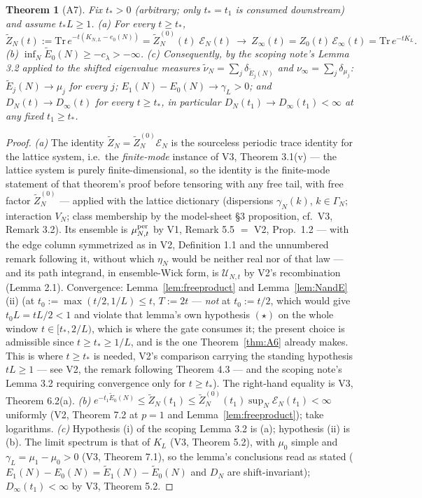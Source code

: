 \documentclass[11pt,a4paper]{article}
\theoremstyle{plain}
\newtheorem{theorem}{Theorem}[section]
\theoremstyle{definition}
\newcommand{\U}{\mathcal U}
\newcommand{\Trace}{\mathrm{Tr}}
\begin{document}
\begin{theorem}[A7]\label{thm:A7}
Fix $t_*>0$ (arbitrary; only $t_*=t_1$ is consumed downstream) and assume
$t_*L\ge1$.
\emph{(a)} For every $t\ge t_*$,
\[
 \widetilde Z_N(t):=\Trace\,e^{-t(K_{N,L}-e_0(N))}
 =\widetilde Z^{(0)}_N(t)\;\mathcal E_N(t)
 \ \longrightarrow\
 Z_\infty(t)=Z_0(t)\,\mathcal E_\infty(t)=\Trace\,e^{-tK_L}.
\]
\emph{(b)} $\inf_N\widetilde E_0(N)\ge-c_\lambda>-\infty$.
\emph{(c)} Consequently, by the scoping note's Lemma 3.2 applied to the
shifted eigenvalue measures $\widetilde\nu_N=\sum_j
\delta_{\widetilde E_j(N)}$ and $\nu_\infty=\sum_j\delta_{\mu_j}$:
$\widetilde E_j(N)\to\mu_j$ for every $j$;
$E_1(N)-E_0(N)\to\gamma_L>0$; and $D_N(t)\to D_\infty(t)$ for every
$t\ge t_*$, in particular $D_N(t_1)\to D_\infty(t_1)<\infty$ at any fixed
$t_1\ge t_*$.
\end{theorem}

\begin{proof}
\emph{(a)} The identity $\widetilde Z_N=\widetilde Z^{(0)}_N\mathcal
E_N$ is the sourceless periodic trace identity for the lattice system,
i.e.\ the \emph{finite-mode} instance of V3, Theorem 3.1(v) --- the
lattice system is purely finite-dimensional, so the identity is the
finite-mode statement of that theorem's proof before tensoring with any
free tail, with free factor $\widetilde Z^{(0)}_N$ --- applied with the
lattice dictionary (dispersions $\gamma_N(k)$, $k\in\Gamma_N$;
interaction $V_N$; class membership by the model-sheet \S3 proposition,
cf.\ V3, Remark 3.2). Its ensemble is $\mu^{\rm per}_{N,t}$ by V1,
Remark 5.5 $=$ V2, Prop.\ 1.2 --- with the edge column symmetrized as in V2,
Definition 1.1 and the unnumbered remark following it, without which $\eta_N$ would be
neither real nor of that law --- and its path integrand, in ensemble-Wick form, is $\U_{N,t}$ by V2's
recombination (Lemma 2.1). Convergence: Lemma~\ref{lem:freeproduct} and
Lemma~\ref{lem:NandE}(ii) (at $t_0:=\max(t/2,1/L)\le t$, $T:=2t$ --- \emph{not} at
$t_0:=t/2$, which would give $t_0L=tL/2<1$ and violate that lemma's own hypothesis
$(\star)$ on the whole window $t\in[t_*,2/L)$, which is where the gate consumes it;
the present choice is admissible since $t\ge t_*\ge1/L$, and is the one
Theorem~\ref{thm:A6} already makes. This is where $t\ge t_*$ is
needed, V2's comparison carrying the standing hypothesis $tL\ge1$ --- see V2,
the remark following Theorem 4.3 --- and the scoping note's Lemma 3.2 requiring convergence only for
$t\ge t_*$). The right-hand
equality is V3, Theorem 6.2(a).
\emph{(b)} $e^{-t_1\widetilde E_0(N)}\le\widetilde Z_N(t_1)
\le\widetilde Z^{(0)}_N(t_1)\sup_N\mathcal E_N(t_1)<\infty$ uniformly
(V2, Theorem 7.2 at $p=1$ and Lemma~\ref{lem:freeproduct}); take
logarithms.
\emph{(c)} Hypothesis (i) of the scoping Lemma 3.2 is (a); hypothesis
(ii) is (b). The limit spectrum is that of $K_L$ (V3, Theorem 5.2), with
$\mu_0$ simple and $\gamma_L=\mu_1-\mu_0>0$ (V3, Theorem 7.1), so the
lemma's conclusions read as stated ($E_1(N)-E_0(N)=\widetilde
E_1(N)-\widetilde E_0(N)$ and $D_N$ are shift-invariant);
$D_\infty(t_1)<\infty$ by V3, Theorem 5.2.
\end{proof}
\end{document}

